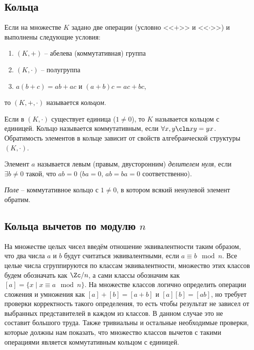 \subsection{Кольца}

\begin{df}
  Если на множестве $K$ задано две операции (условно <<$+$>> и <<$\cdot$>>) и выполнены следующие условия:
  \begin{enumerate}
    \item $(K,+)$ -- абелева (коммутативная) группа
    \item $(K,\cdot)$ -- полугруппа
    \item $a(b+c)=ab+ac$ и $(a+b)c=ac+bc$,
  \end{enumerate}
  то $(K,+,\cdot)$ называется \emph{кольцом}.

  Если в $(K,\cdot)$ существует единица ($1\ne0$), то $K$ называется кольцом с единицей. Кольцо называется коммутативным, если $\forall x,y\cln xy=yx$. Обратимость элементов в кольце зависит от свойств алгебраической структуры $(K,\cdot)$.
\end{df}

\begin{df}
  Элемент $a$ называется левым (правым, двусторонним) \emph{делителем нуля}, если $\exists b\ne0$ такой, что $ab=0$ ($ba=0$, $ab=ba=0$ соответственно).
\end{df}

\begin{df}
  \emph{Поле} -- коммутативное кольцо с $1\ne0$, в котором всякий ненулевой элемент обратим.
\end{df}

\subsection{Кольца вычетов по модулю $n$}

На множестве целых чисел введём отношение эквивалентности таким
образом, что два числа $a$ и $b$ будут считаться эквивалентными, если
$a\equiv b \mod n$. Все целые числа сгруппируются по классам
эквивалентности, множество этих классов будем обозначать как $\Zc/n$,
а сами классы обозначим как $[a]=\{x\mid x\equiv a \mod n\}$. На
множестве классов логично определить операции сложения и умножения как
$[a]+[b]=[a+b]$ и $[a][b]=[ab]$, но требует проверки корректность
такого определения, то есть чтобы результат не зависел от выбранных
представителей в каждом из классов. В данном случае это не составит
большого труда. Также тривиальны и остальные необходимые проверки,
которые должны нам показать, что множество классов вычетов с такими
операциями является коммутативным кольцом с
единицей.

